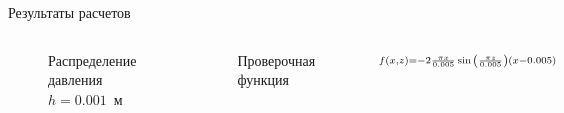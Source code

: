 \documentclass[ignoreonframetext,unicode]{beamer}
\begin{document}
\begin{frame}{Результаты расчетов}
	

	
	\begin{columns}
		
	
		\vspace*{-10mm}
		\begin{figure}[!htbp]
			\caption{Распределение давления $h = 0.001$~м}
			\label{res_static}
		\end{figure}
	
	
	\vspace*{-7mm}
		\begin{figure}[!htbp]
			\caption{Проверочная функция}
			\label{check_func_1_pic}
		\end{figure}
		\vspace*{-2mm}
		\begin{block}{}
			\begin{equation*}
				\vspace*{5mm}
				{\scriptstyle 
					f(x, z) = -2 \frac{\pi x }{0.005} \sin{\left(\frac{\pi z}{0.005}\right)} \left(x - 0.005\right)
				}
			\end{equation*}
		\end{block}
		
	
		
	\end{columns}

	
\end{frame}
\end{document}
